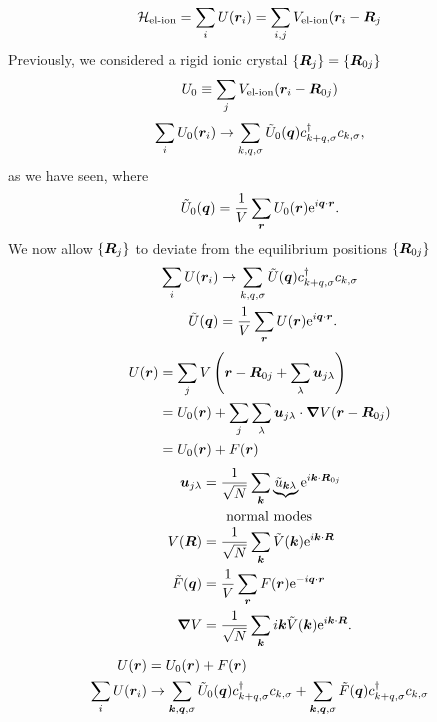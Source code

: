 \begin{equation}
	\mathcal{H}_{\text{el-ion}} = \sum_{i}U(\bm{r}_{i}) = \sum_{i,j}V_{\text{el-ion}}(\bm{r}_{i}-\bm{R}_{j}
\end{equation}
Previously, we considered a rigid ionic crystal $\{\bm{R}_j\} = \{\bm{R}_{0j}\}$
\begin{equation}
	U_0 \equiv \sum_{j}V_{\text{el-ion}}(\bm{r}_{i} - \bm{R}_{0j}) \\
\end{equation}
\begin{equation}
	\sum_{i}U_{0}(\bm{r}_{i}) \rightarrow \sum_{k,q,\sigma}\tilde{U}_{0}(\bm{q})c^{\dagger}_{k+q,\sigma}c_{k,\sigma},
\end{equation}
as we have seen, where
\begin{equation}
	\tilde{U}_{0}(\bm{q}) = \frac{1}{V}\sum_{\bm{r}}U_{0}(\bm{r})\mathrm{e}^{i\bm{q}\cdot\bm{r}}.
\end{equation}
We now allow $\{\bm{R}_{j}\}$ to deviate from the equilibrium positions $\{\bm{R}_{0j}\}$
\begin{align}
	\sum_{i}U(\bm{r}_{i}) &\rightarrow \sum_{k,q,\sigma}\tilde{U}(\bm{q})c^{\dagger}_{k+q, \sigma}c_{k,\sigma}\\
		\tilde{U}(\bm{q}) &= \frac{1}{V}\sum_{\bm{r}}U(\bm{r})\mathrm{e}^{i\bm{q}\cdot\bm{r}}.
\end{align}
\begin{align}
	U(\bm{r}) &= \sum_{j}V\left (\bm{r} - \bm{R}_{0j} + \sum_{\lambda}\bm{u}_{j\lambda}\right ) \nonumber \\
	&= U_{0}(\bm{r}) + \sum_{j}\sum_{\lambda}\bm{u}_{j\lambda}\cdot \grad{V}(\bm{r}-\bm{R}_{0j}) \nonumber \\
	&= U_{0}(\bm{r}) + F(\bm{r})
\end{align}
\begin{align}
	\bm{u}_{j\lambda} &= \frac{1}{\sqrt{N}}\sum_{\bm{k}}\underbrace{\tilde{u}_{\bm{k}\lambda}}_{\mathclap{\parbox{3cm}{\vspace{0.8em}normal modes}}}\e^{i\bm{k}\cdot\vR_{0j}} \\
V(\vR) &= \frac{1}{\sqrt{N}}\sum_{\bm{k}}\tilde{V}(\bm{k})\e^{i\bm{k}\cdot \vR} \\
\tilde{F}(\vq) &= \frac{1}{V}\sum_{\vr}F(\vr)\e^{-i\vq\cdot\vr} \\
\grad{V} &= \frac{1}{\sqrt{N}}\sum_{\bm{k}}i\bm{k}\tilde{V}(\bm{k})\e^{i\bm{k}\cdot\vR}.
\end{align}
\begin{align}
	U(\bm{r}) &= U_{0}(\bm{r}) + F(\bm{r}) \\ 
	\sum_{i}U(\bm{r}_{i})&\rightarrow \sum_{\bm{k},\bm{q},\sigma}\tilde{U}_{0}(\bm{q})c^{\dagger}_{k+q,\sigma}c_{k,\sigma} + \sum_{\bm{k},\bm{q},\sigma}\tilde{F}(\bm{q})c^{\dagger}_{k+q,\sigma}c_{k,\sigma}
\end{align}
